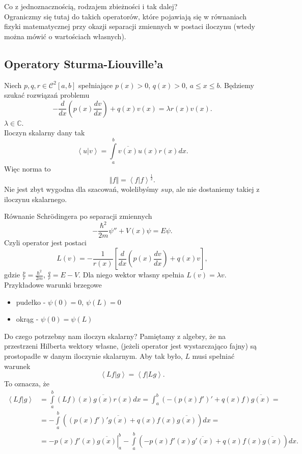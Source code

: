 \documentclass[../main.tex]{subfiles}
\begin{document}
				 Co z jednoznacznością, rodzajem zbieżności i tak dalej?\\
				 Ograniczmy się tutaj do takich operatorów, które pojawiają się w równaniach fizyki matematycznej przy okazji separacji zmiennych w postaci iloczynu (wtedy można mówić o wartościach własnych).
				 \subsection{Operatory Sturma-Liouville'a}
		Niech $p,q,r \in \mathcal{C}^2[a,b]$ spełniające $p(x) > 0$, $q(x) > 0$, $a \le x \le b$. Będziemy szukać rozwiązań problemu
		\[
				-\frac{d}{dx}\left( p(x) \frac{dv}{dx} \right) + q(x)v(x) = \lambda r(x) v(x)
		.\]
		$\lambda\in \mathbb{C}$.\\
		Iloczyn skalarny dany tak
		\[
				\left<u|v \right> = \int\limits_a^b \overline{v(x)} u(x) r(x) dx
		.\]
		Więc norma to
		\[
		\Vert f \Vert = \left<f|f \right>^{\frac{1}{2}}
		.\]
		Nie jest zbyt wygodna dla szacowań, wolelibyśmy $sup$, ale nie dostaniemy takiej z iloczynu skalarnego.
		\begin{przyklad}
				Równanie Schr\"odingera po separacji zmiennych
				\[
						-\frac{\hbar^2}{2m}\psi'' + V(x)\psi = E\psi
				.\]
				Czyli operator jest postaci
				\[
						L(v) = -\frac{1}{r(x)}\left[ \frac{d}{dx}\left( p(x)\frac{dv}{dx} \right) + q(x)v \right]
				,\]
				gdzie $\frac{p}{r} = \frac{\hbar^2}{2m}$, $\frac{q}{r} = E-V$.
				Dla niego wektor własny spełnia $L(v) = \lambda v$. \\
				Przykładowe warunki brzegowe
				\begin{itemize}
						\item pudełko - $\psi(0) = 0$, $\psi(L) = 0$
						\item okrąg -  $\psi(0) = \psi(L)$
				\end{itemize}
		\end{przyklad}
		Do czego potrzebny nam iloczyn skalarny? Pamiętamy z algebry, że na przestrzeni Hilberta wektory własne, (jeżeli operator jest wystarczająco fajny) są prostopadłe w danym iloczynie skalarnym. Aby tak było, $L$ musi spełniać warunek
		\[
		\left<L f|g \right> = \left<f|Lg \right>
		.\]
		To oznacza, że
		\begin{align*}
				\left<Lf|g \right> &= \int\limits_a^b (Lf)(x)\overline{g(x)} r(x)dx = \int_a^b\left( -(p(x)f')' + q(x)f \right) \overline{g(x)} = \\
				&= - \int\limits_a^b \left( (p(x)f')'\overline{g(x)} + q(x)f(x)\overline{g(x)}  \right) dx = \\
				&= -\left.p(x)f'(x) \overline{g(x)} \right|_a^b - \int\limits_a^b\left( -p(x)f'(x)\overline{g'(x)} + q(x)f(x)\overline{g(x)}  \right) dx
		.\end{align*}
\end{document}
